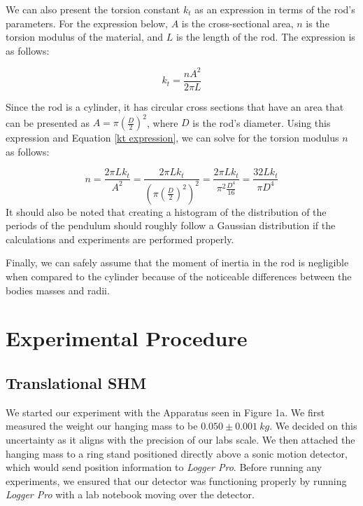\documentclass[12pt]{article}
\begin{document}
We can also present the torsion constant $k_t$ as an expression in terms of the rod's parameters. For the expression below, $A$ is the cross-sectional area, $n$ is the torsion modulus of the material, and $L$ is the length of the rod. The expression is as follows:

\begin{equation}
    k_t=\frac{nA^2}{2\pi L} \label{kt expression}
\end{equation}

Since the rod is a cylinder, it has circular cross sections that have an area that can be presented as $A=\pi(\frac{D}{2})^2$, where $D$ is the rod's diameter. Using this expression and Equation \ref{kt expression}, we can solve for the torsion modulus $n$ as follows:

\begin{equation}
    n=\frac{2\pi L k_t}{A^2}=\frac{2\pi L k_t}{(\pi(\frac{D}{2})^2)^2}=\frac{2\pi L k_t}{\pi^2\frac{D^4}{16}}=\frac{32 L k_t}{\pi D^4}\label{torsion modulus}
\end{equation}
It should also be noted that creating a histogram of the distribution of the periods of the pendulum should roughly follow a Gaussian distribution if the calculations and experiments are performed properly. \par
Finally, we can safely assume that the moment of inertia in the rod is negligible when compared to the cylinder because of the noticeable differences between the bodies masses and radii.

\section{Experimental Procedure}

\subsection{Translational SHM}
We started our experiment with the Apparatus seen in Figure 1a. We first measured the weight our hanging mass to be $0.050\pm0.001\ kg$. We decided on this uncertainty as it aligns with the precision of our labs scale. We then attached the hanging mass to a ring stand positioned directly above a sonic motion detector, which would send position information to \textit{Logger Pro}. Before running any experiments, we ensured that our detector was functioning properly by running \textit{Logger Pro} with a lab notebook moving over the detector. \par
\end{document}
